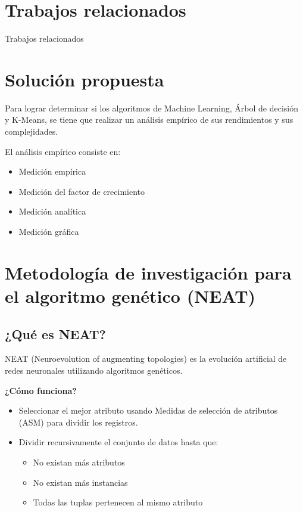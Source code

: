 \documentclass{article}
\begin{document}
\section{Trabajos relacionados}

Trabajos relacionados

\section{Solución propuesta}
Para lograr determinar si los algoritmos de Machine Learning, Árbol de decisión y K-Means, se tiene que realizar un análisis empírico de sus rendimientos y sus complejidades.

El análisis empírico consiste en:
\begin{itemize}
  \item Medición empírica
  \item Medición del factor de crecimiento
  \item Medición analítica
  \item Medición gráfica
\end{itemize}


\section{Metodología de investigación para el algoritmo genético (NEAT)}
\subsection{¿Qué es NEAT?}
NEAT (Neuroevolution of augmenting topologies) es la evolución artificial de redes neuronales utilizando algoritmos genéticos. \textcite{neat2002}

\textbf{¿Cómo funciona?}

\begin{itemize}
        \item Seleccionar el mejor atributo usando Medidas de selección de atributos (ASM) para dividir los registros.
        \item Dividir recursivamente el conjunto de datos hasta que:
        \begin{itemize}
          \item No existan más atributos
          \item No existan más instancias
          \item Todas las tuplas pertenecen al mismo atributo
        \end{itemize}
\end{itemize}
\end{document}
